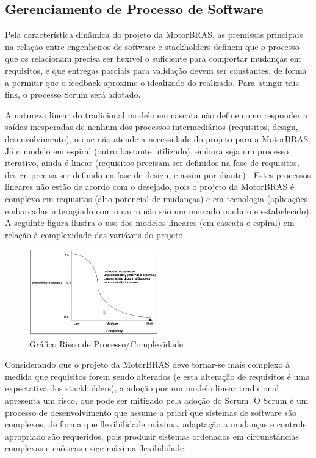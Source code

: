 \documentclass[12pt,journal,compsoc]{IEEEtran}
\begin{document}
\subsection{Gerenciamento de Processo de Software}

Pela característica dinâmica do projeto da MotorBRAS, as premissas principais na relação entre engenheiros de software e stackholders definem que o processo que os relacionam precisa ser flexível o suficiente para comportar mudanças em requisitos, e que entregas parciais para validação devem ser constantes, de forma a permitir que o feedback aproxime o idealizado do realizado. Para atingir tais fins, o processo Scrum será adotado. 

A natureza linear do tradicional modelo em cascata não define como responder a saídas inesperadas de nenhum dos processos intermediários (requisitos, design, desenvolvimento), o que não atende a necessidade do projeto para a MotorBRAS. Já o modelo em espiral (outro bastante utilizado), embora seja um processo iterativo, ainda é linear (requisitos precisam ser definidos na fase de requisitos, design precisa ser definido na fase de design, e assim por diante) \cite{scrum_development_process}. Estes processos lineares não estão de acordo com o desejado, pois o projeto da MotorBRAS é complexo em requisitos (alto potencial de mudanças) e em tecnologia (aplicações embarcadas interagindo com o carro não são um mercado maduro e estabelecido). A seguinte figura ilustra o uso dos modelos lineares (em cascata e espiral) em relação à complexidade das variáveis do projeto. 

\begin{figure}[ht!]
\centering
\includegraphics[width=0.5\textwidth]{scrum_risk_complexity_graph}
\caption{Gráfico Risco de Processo/Complexidade \cite{scrum_development_process}}
\label{fig:scrum_risk_complexity_graph}
\end{figure}

Considerando que o projeto da MotorBRAS deve tornar-se mais complexo à medida que requisitos forem sendo alterados (e esta alteração de requisitos é uma expectativa dos stackholders), a adoção por um modelo linear tradicional apresenta um risco, que pode ser mitigado pela adoção do Scrum. O Scrum é um processo de desenvolvimento que assume a priori que sistemas de software são complexos, de forma que flexibilidade máxima, adaptação a mudanças e controle apropriado são requeridos, pois produzir sistemas ordenados em circunstâncias complexas e caóticas exige máxima flexibilidade. \cite{scrum_development_process} 
\end{document}
